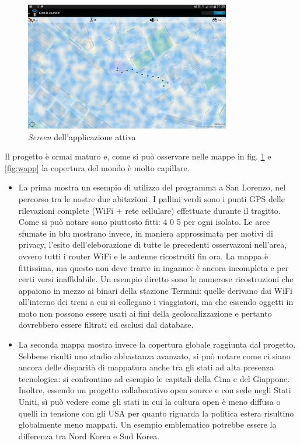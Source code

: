 \begin{figure}[ht!]
	\centering
	\includegraphics[width=0.8\textwidth]{./Immagini/Dati/appmap.jpg}
	\caption{\emph{Screen} dell'applicazione attiva}
	\label{fig:mapp}
\end{figure}
Il progetto è ormai maturo e, come si può osservare nelle mappe in fig. \ref{fig:mapp} e \ref{fig:wapp} la copertura del mondo è molto capillare.
\begin{itemize}
 \item La prima mostra un esempio di utilizzo del programma a San Lorenzo, nel percorso tra le nostre due abitazioni. I pallini verdi sono i punti GPS delle rilevazioni complete (WiFi + rete cellulare) effettuate durante il tragitto. Come si può notare sono piuttosto fitti: 4 0 5 per ogni isolato. Le aree sfumate in blu mostrano invece, in maniera approssimata per motivi di privacy, l'esito dell'eleborazione di tutte le precedenti osservazoni nell'area, ovvero tutti i router WiFi e le antenne ricostruiti fin ora. La mappa è fittissima, ma questo non deve trarre in inganno: è ancora incompleta e per certi versi inaffidabile. Un esempio diretto sono le numerose ricostruzioni che appaiono in mezzo ai binari della stazione Termini: quelle derivano dai WiFi all'interno dei treni a cui si collegano i viaggiatori, ma che essendo oggetti in moto non possono essere usati ai fini della geolocalizzazione e pertanto dovrebbero essere filtrati ed esclusi dal database.
  \item La seconda mappa mostra invece la copertura globale raggiunta dal progetto. Sebbene risulti uno stadio abbastanza avanzato, si può notare come ci siano ancora delle disparità di mappatura anche tra gli stati ad alta presenza tecnologica: si confrontino ad esempio le capitali della Cina e del Giappone. Inoltre, essendo un progetto collaborativo open source e con sede negli Stati Uniti, sì può vedere come gli stati in cui la cultura open è meno diffusa o quelli in tensione con gli USA per quanto riguarda la politica estera risultino globalmente meno mappati. Un esempio emblematico potrebbe essere la differenza tra Nord Korea e Sud Korea.
\end{itemize}

